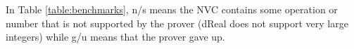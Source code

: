 \documentclass[runningheads]{llncs}
\begin{document}


In Table \ref{table:benchmarks}, n/s means the NVC contains some operation or number that is not supported by the prover (dReal does not support very large integers) 
while g/u means that the prover gave up.


\end{document}
